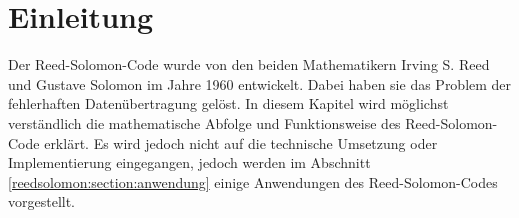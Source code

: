 %
%
%
\section{Einleitung
\label{reedsolomon:section:einleitung}}
Der Reed-Solomon-Code wurde von den beiden Mathematikern Irving S. Reed und Gustave Solomon im Jahre 1960 entwickelt.
%
%
Dabei haben sie das Problem der fehlerhaften Datenübertragung gelöst.
In diesem Kapitel wird möglichst verständlich die mathematische Abfolge und  
Funktionsweise des Reed-Solomon-Code erklärt.
Es wird jedoch nicht auf die technische Umsetzung oder Implementierung eingegangen, jedoch werden im Abschnitt \ref{reedsolomon:section:anwendung} einige Anwendungen des Reed-Solomon-Codes vorgestellt.




